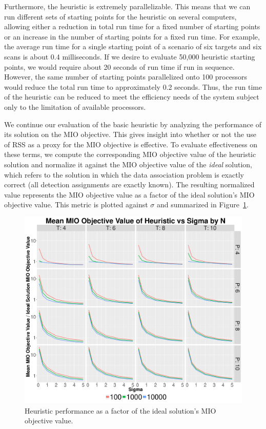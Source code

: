 Furthermore, the heuristic is extremely parallelizable. This means that we can run different sets of starting points for the heuristic on several computers, allowing either a reduction in total run time for a fixed number of starting points or an increase in the number of starting points for a fixed run time. For example, the average run time for a single starting point of a scenario of six targets and six scans is about 0.4 milliseconds. If we desire to evaluate 50,000 heuristic starting points, we would require about 20 seconds of run time if run in sequence. However, the same number of starting points parallelized onto 100 processors would reduce the total run time to approximately 0.2 seconds. Thus, the run time of the heuristic can be reduced to meet the efficiency needs of the system subject only to the limitation of available processors. 

We continue our evaluation of the basic heuristic by analyzing the performance of its solution on the MIO objective. This gives insight into whether or not the use of RSS as a proxy for the MIO objective is effective. To evaluate effectiveness on these terms, we compute the corresponding MIO objective value of the heuristic solution and normalize it against the MIO objective value of the \textit{ideal} solution, which refers to the solution in which the data association problem is exactly correct (all detection assignments are exactly known). The resulting normalized value represents the MIO objective value as a factor of the ideal solution's MIO objective value. This metric is plotted against $\sigma$ and summarized in Figure~\ref{fig:Basic_Heuristic_Objective}. 

\begin{figure}[ht]
  \centering
  \includegraphics[width=\columnwidth]{../Figures/Basic_Heuristic_Objective}
  \caption{Heuristic performance as a factor of the ideal solution's MIO objective value.}
  \label{fig:Basic_Heuristic_Objective}
\end{figure}

